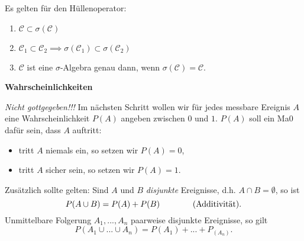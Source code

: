 \documentclass[a4paper, landscape,twocolumn,fontsize=9pt]{scrartcl}
\begin{document}
Es gelten für den Hüllenoperator:
\begin{enumerate}
	\item $\mathcal C \subset \sigma(\mathcal C)$
	\item $\mathcal C_1 \subset \mathcal C_2 \implies \sigma(\mathcal C_1) \subset \sigma(\mathcal C_2)$
	\item $\mathcal C$ ist eine $\sigma$-Algebra genau dann, wenn $\sigma(\mathcal C) = \mathcal C$.
\end{enumerate}

\textbf{Wahrscheinlichkeiten}

\textit{Nicht gottgegeben!!!} Im nächsten Schritt wollen wir für jedes messbare Ereignis $A$ eine Wahrscheinlichkeit $P(A)$ angeben zwischen $0$ und $1$. $P(A)$ soll ein Ma0 dafür sein, dass $A$ auftritt:
\begin{itemize}
	\item tritt $A$ niemals ein, so setzen wir $P(A) = 0$,
	\item tritt $A$ sicher sein, so setzen wir $P(A) = 1$.
\end{itemize}
Zusätzlich sollte gelten: Sind $A$ und $B$ \emph{disjunkte} Ereignisse, d.h. $A \cap B = \emptyset$, so ist \begin{equation*}P (A \cup B) = P(A) + P(B) \qquad \tag{{Additivität}}.\end{equation*}
Unmittelbare Folgerung $A_1,...,A_n$ paarweise disjunkte Ereignisse, so gilt
\[
	P(A_1 \cup ... \cup A_n) = P(A_1) + ... + P_(A_n).
\]
\end{document}
